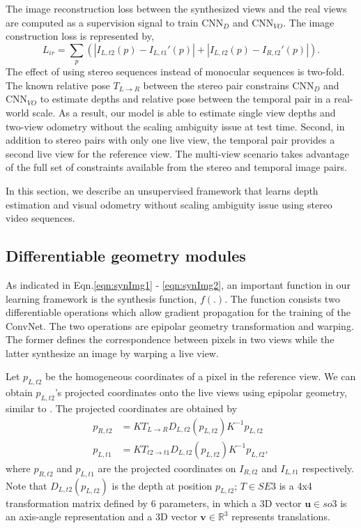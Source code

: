 \documentclass[10pt,twocolumn,letterpaper]{article}
\begin{document}
The image reconstruction loss between the synthesized views and the real views are computed as a supervision signal to train $\text{CNN}_{D}$ and $\text{CNN}_{VO}$. The image construction loss is represented by,
\begin{equation}
    L_{ir} = \sum_{p} \left( {|I_{L,t2}(p) - I_{L,t1}'(p)|}  + 
    {|I_{L,t2}(p) - I_{R,t2}'(p)|} \right). \label{eqn:imgLoss}
\end{equation}
The effect of using stereo sequences instead of monocular sequences is two-fold. 
The known relative pose $T_{L \rightarrow R}$ between the stereo pair constrains $\text{CNN}_D$ and $\text{CNN}_{VO}$ to estimate depths and relative pose between the temporal pair in a real-world scale. As a result, our model is able to estimate single view depths and two-view odometry without the scaling ambiguity issue at test time.
Second, in addition to stereo pairs with only one live view, the temporal pair provides a second live view for the reference view. The multi-view scenario takes advantage of the full set of constraints available from the stereo and temporal image pairs.

In this section, we describe an unsupervised framework that learns depth estimation and visual odometry without scaling ambiguity issue using stereo video sequences. 



\subsection{Differentiable geometry modules} \label{sec:method_diffGeoModules}

As indicated in Eqn.\ref{eqn:synImg1} - \ref{eqn:synImg2}, an important function in our learning framework is the synthesis function, $f(.)$. The function consists two differentiable operations which allow gradient propagation for the training of the ConvNet. 
The two operations are epipolar geometry transformation and warping. The former defines the correspondence between pixels in two views while the latter synthesize an image by warping a live view.


Let $p_{L,t2}$ be the homogeneous coordinates of a pixel in the reference view. 
We can obtain $p_{L,t2}$'s projected coordinates onto the live views using epipolar geometry, similar to \cite{handa2016gvnn,zhou2017sfmlearner}. The projected coordinates are obtained by
\begin{align}
    p_{R,t2} &= K T_{L \rightarrow R} D_{L,t2}(p_{L,t2}) K^{-1} p_{L,t2} \label{eqn:projCoorR}\\
    p_{L,t1} &= K T_{t2 \rightarrow t1} D_{L,t2}(p_{L,t2}) K^{-1} p_{L,t2} \label{eqn:projCoort1}, 
\end{align}
where $p_{R,t2}$ and $p_{L,t1}$ are the projected coordinates on $I_{R,t2}$ and $I_{L,t1}$ respectively.
Note that $D_{L,t2}(p_{L,t2})$ is the depth at position $p_{L,t2}$;
$T \in SE3$ is a 4x4 transformation matrix defined by 6 parameters, in which a 3D vector $\mathbf{u} \in so3$ is an axis-angle representation and a 3D vector $\mathbf{v} \in \mathbb{R}^{3}$ represents translations.
\end{document}
